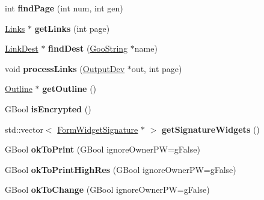 \begin{DoxyCompactItemize}
\item 
\mbox{\label{class_p_d_f_doc_afea816c7ef90394688b12446081ec789}} 
int {\bfseries find\+Page} (int num, int gen)
\item 
\mbox{\label{class_p_d_f_doc_a7e20189ef8325e41ed3ac383078f93f5}} 
\hyperlink{class_links}{Links} $\ast$ {\bfseries get\+Links} (int page)
\item 
\mbox{\label{class_p_d_f_doc_a81efe4aa7d7b179e4a8970846496738d}} 
\hyperlink{class_link_dest}{Link\+Dest} $\ast$ {\bfseries find\+Dest} (\hyperlink{class_goo_string}{Goo\+String} $\ast$name)
\item 
\mbox{\label{class_p_d_f_doc_a57d4fbac4c25cf3894dd45d1f3668985}} 
void {\bfseries process\+Links} (\hyperlink{class_output_dev}{Output\+Dev} $\ast$out, int page)
\item 
\mbox{\label{class_p_d_f_doc_ae1f35dbfe66dbef4ccc830110b8cc83f}} 
\hyperlink{class_outline}{Outline} $\ast$ {\bfseries get\+Outline} ()
\item 
\mbox{\label{class_p_d_f_doc_a79d1b9184fba58d68b83de407446fdf5}} 
G\+Bool {\bfseries is\+Encrypted} ()
\item 
\mbox{\label{class_p_d_f_doc_ac1c664763ec482e247fbe81b896da403}} 
std\+::vector$<$ \hyperlink{class_form_widget_signature}{Form\+Widget\+Signature} $\ast$ $>$ {\bfseries get\+Signature\+Widgets} ()
\item 
\mbox{\label{class_p_d_f_doc_a15623de9a6d69915ca7b5a97e1b42a46}} 
G\+Bool {\bfseries ok\+To\+Print} (G\+Bool ignore\+Owner\+PW=g\+False)
\item 
\mbox{\label{class_p_d_f_doc_a0123d22d68fe3a482696677e3cf2ac03}} 
G\+Bool {\bfseries ok\+To\+Print\+High\+Res} (G\+Bool ignore\+Owner\+PW=g\+False)
\item 
\mbox{\label{class_p_d_f_doc_a2636a307a7802fda56fc9d009c93280f}} 
G\+Bool {\bfseries ok\+To\+Change} (G\+Bool ignore\+Owner\+PW=g\+False)
\item 

\end{DoxyCompactItemize}
